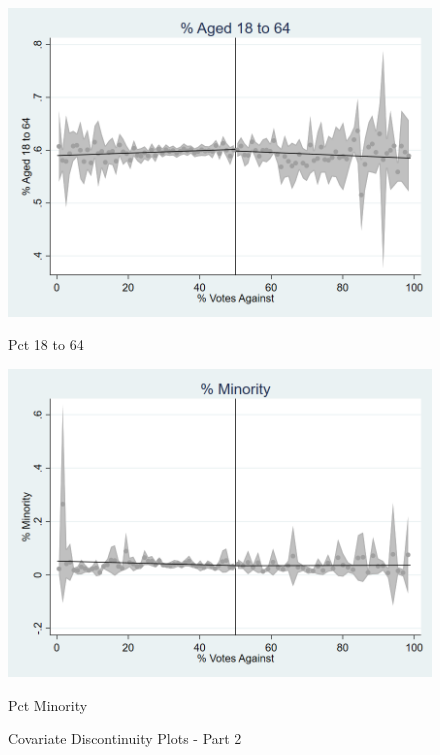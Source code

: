 \begin{figure}[ht]
    \begin{minipage}[b]{0.40\textwidth}
        \centering
        \includegraphics[width=\textwidth,keepaspectratio]{images/cov_smoothness_pct18to64.png}
        \caption*{Pct 18 to 64}
        \label{fig:pct18to64_sm}
    \end{minipage}
    \hfill
    \begin{minipage}[b]{0.40\textwidth}
        \centering
        \includegraphics[width=\textwidth,keepaspectratio]{images/cov_smoothness_pctmin.png}
        \caption*{Pct Minority}
        \label{fig:pctmin_sm}
    \end{minipage}
    
    \caption{Covariate Discontinuity Plots - Part 2}
    \label{fig:rd_cov_smoothness_2}
\end{figure}


